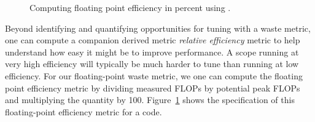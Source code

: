 \documentclass[11pt,letterpaper]{report}
\begin{document}
\begin{figure}[t]
\caption{Computing floating point efficiency in percent using \hpcviewer{}.}
\label{fig:fpefficiency}
\end{figure}

Beyond identifying and quantifying opportunities for tuning with a waste metric, one can compute a companion derived metric {\em relative efficiency} metric to help understand how easy it might be to improve performance.
A scope running at very high efficiency will typically be much harder to tune than running at low efficiency.
For our floating-point waste metric, we one can compute the floating point efficiency metric by dividing measured FLOPs by potential peak FLOPs and multiplying the quantity by 100.
Figure~\ref{fig:fpefficiency} shows the specification of this floating-point efficiency metric for a code.
\end{document}
